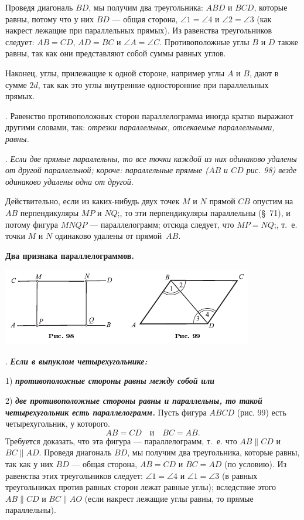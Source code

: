 \documentclass[oneside]{book}
\begin{document}
Проведя диагональ $BD$, мы получим два треугольника:
$ABD$ и $BCD$, которые равны, потому что у них $BD$ — общая сторона, $\angle 1 = \angle 4$ и $\angle 2 = \angle 3$ (как накрест лежащие при параллельных прямых).
Из равенства треугольников следует:
$AB=CD$, $AD=BC$ и $\angle A = \angle C$.
Противоположные углы $B$ и $D$ также равны, так как они представляют собой суммы равных углов.

Наконец, углы, прилежащие к одной стороне, например углы $A$ и $B$, дают в сумме $2d$, так как это углы внутренние односторонние при параллельных прямых.

.
Равенство противоположных сторон параллелограмма иногда кратко выражают другими словами, так:
\emph{отрезки параллельных, отсекаемые параллельными, равны.}

.
\emph{Если две прямые параллельны, то все точки каждой из них одинаково удалены от другой параллельной;
короче:
параллельные прямые \emph{($AB$ и $CD$ рис. 98)} везде одинаково удалены одна от другой.}

Действительно, если из каких-нибудь двух точек $M$ и $N$ прямой $CB$ опустим на $AB$ перпендикуляры $MP$ и $NQ$;, то эти перпендикуляры параллельны (§~71), и потому фигура $MNQP$ — параллелограмм;
отсюда следует, что $MP=NQ$;, т.~е. точки $M$ и $N$ одинаково удалены от прямой~$AB$.

\textbf{Два признака параллелограммов.}

\includegraphics{pics/ris-98-99}

.
\textbf{\emph{Если в выпуклом четырехугольнике:}}

1) \textbf{\emph{противоположные стороны равны между собой или}}

2) \textbf{\emph{две противоположные стороны равны и параллельны, то такой четырехугольник есть параллелограмм.}}
Пусть фигура $ABCD$ (рис. 99) есть четырехугольник, у которого.
\[AB=CD\quad \text{и}\quad BC=AB.\]
Требуется доказать, что эта фигура — параллелограмм, т.~е. что $AB\parallel CD$ и $BC \parallel AD$.
Проведя диагональ $BD$, мы получим два треугольника, которые равны, так как у них $BD$ — общая сторона, $AB=CD$ и $BC = AD$ (по условию).
Из равенства этих треугольников следует:
$\angle 1 = \angle 4 $ и $\angle 1 = \angle 3$ (в равных треугольниках против равных сторон лежат равные углы);
вследствие этого $AB \parallel CD$ и $BC\parallel AO$ (если накрест лежащие углы равны, то прямые параллельны).
\end{document}
